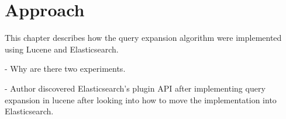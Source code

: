 \chapter{Approach}
\label{ch:approach}
This chapter describes how the query expansion algorithm were implemented using Lucene and Elasticsearch.

- Why are there two experiments.

- Author discovered Elasticsearch's plugin API after implementing query expansion in lucene after looking into how to move the implementation into Elasticsearch.

